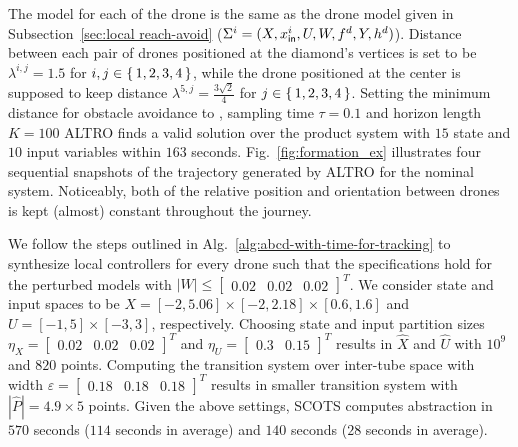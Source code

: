 The model for each of the drone is the same as the drone model given in Subsection~\ref{sec:local reach-avoid} ($\Sigma^i=(X,x_{\mathsf{in}}^i,U,W,f^d,Y,h^d)$). Distance between each pair of drones positioned at the diamond's vertices is set to be $\lambda^{i,j}=1.5$ for $i,j\in\set{1,2,3,4}$, while the drone positioned at the center is supposed to keep distance $\lambda^{5,j}=\frac{3\sqrt{2}}{4}$ for $j\in\set{1,2,3,4}$. Setting the minimum distance for obstacle avoidance to , sampling time $\tau=0.1$ and horizon length $K=100$ ALTRO finds a valid solution over the product system with $15$ state and $10$ input variables within $163$ seconds. Fig.~\ref{fig:formation_ex} illustrates four sequential snapshots of the trajectory generated by ALTRO for the nominal system. Noticeably, both of the relative position and orientation between drones is kept (almost) constant throughout the journey. 

We follow the steps outlined in Alg.~\ref{alg:abcd-with-time-for-tracking} to synthesize local controllers for every drone such that the specifications hold for the perturbed models with $|W|\leq \begin{bmatrix}0.02&0.02&0.02\end{bmatrix}^T$. %
We consider state and input spaces to be $X=[-2,5.06]\times[-2,2.18]\times[0.6,1.6]$ and
$U=[-1,5]\times[-3,3]$, respectively. Choosing state and input partition sizes $\eta_{X}=\begin{bmatrix}0.02&0.02&0.02\end{bmatrix}^T$ and
$\eta_{U}=\begin{bmatrix}0.3&0.15\end{bmatrix}^T$ results in $\hat X$ and $\hat U$ with $10^9$ and $820$ points. 
Computing the transition system over inter-tube space with width $\varepsilon=\begin{bmatrix}0.18&0.18&0.18\end{bmatrix}^T$ results in smaller transition system with $|\hat P|=4.9\times 5$ points. Given the above settings, SCOTS computes abstraction in $570$ seconds ($114$ seconds in average) and $140$ seconds ($28$ seconds in average). 

